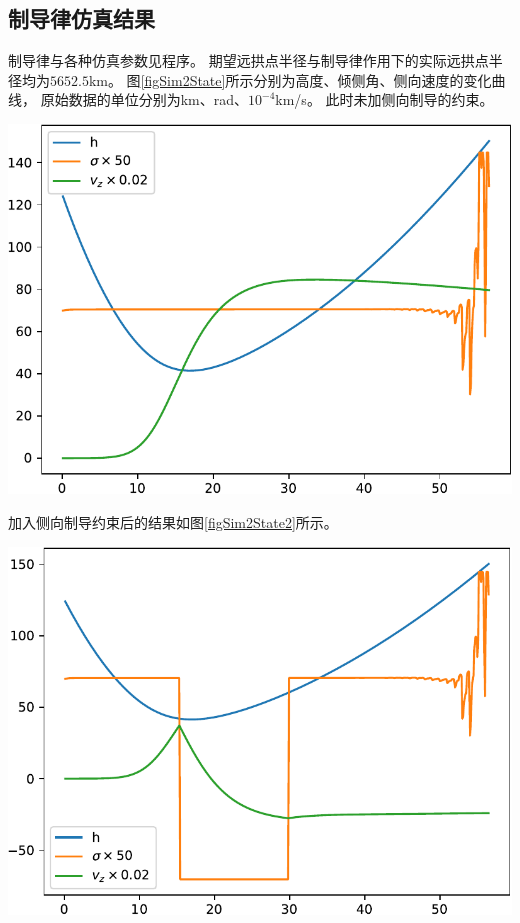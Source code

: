 \subsection{制导律仿真结果}
制导律与各种仿真参数见程序。
期望远拱点半径与制导律作用下的实际远拱点半径均为$5652.5$km。
图\ref{figSim2State}所示分别为高度、倾侧角、侧向速度的变化曲线，
原始数据的单位分别为km、rad、$10^{-4}$km/s。
此时未加侧向制导的约束。
\begin{center}
	\includegraphics[scale=0.6]{Sim2State.pdf} \\
	\label{figSim2State}
\end{center}
加入侧向制导约束后的结果如图\ref{figSim2State2}所示。
\begin{center}
	\includegraphics[scale=0.6]{Sim2State2.pdf} \\
	\label{figSim2State2}
\end{center}

